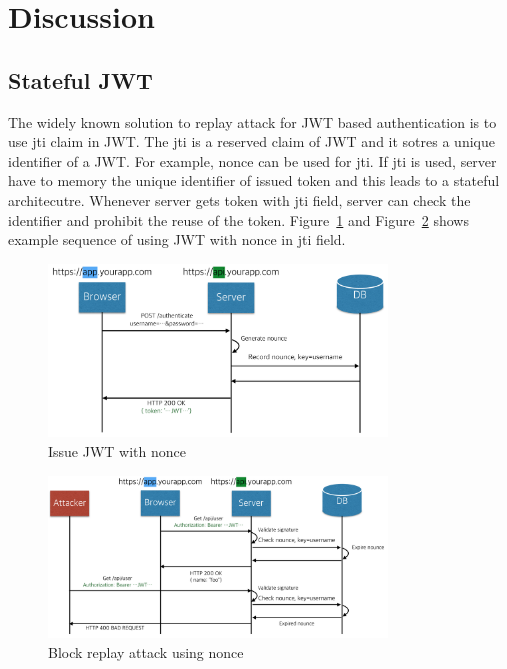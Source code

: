 \documentclass[journal,article,submit,moreauthors,pdftex,10pt,a4paper]{mdpi}
\begin{document}

\section{Discussion}
\subsection{Stateful JWT}
The widely known solution to replay attack for JWT based authentication is to use jti claim in JWT. The jti is a reserved claim of JWT and it sotres a unique identifier of a JWT. For example, nonce can be used for jti. If jti is used, server have to memory the unique identifier of issued token and this leads to a stateful architecutre. Whenever server gets token with jti field, server can check the identifier and prohibit the reuse of the token. Figure~\ref{nonce_issue} and Figure~\ref{nonce_use} shows example sequence of using JWT with nonce in jti field.

\begin{figure}[H]
\centering
\includegraphics[width=9cm]{figures/nonce_issue}
\caption{Issue JWT with nonce}
\label{nonce_issue}
\end{figure}

\begin{figure}[H]
\centering
\includegraphics[width=9cm]{figures/nonce_use}
\caption{Block replay attack using nonce}
\label{nonce_use}
\end{figure}
\end{document}
